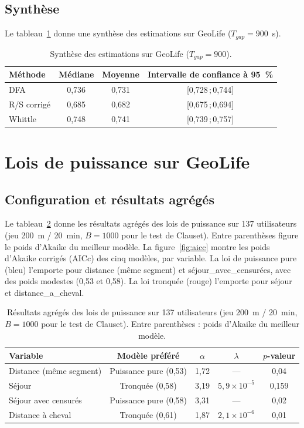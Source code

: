 \subsection{Synthèse}
Le tableau~\ref{tab:synthese_h} donne une synthèse des estimations sur GeoLife ($T_{gap} = 900$~s).

\begin{table}[H]
\centering
\caption{Synthèse des estimations sur GeoLife ($T_{gap}=900$).}
\label{tab:synthese_h}
\begin{tabular}{lccc}
\toprule
Méthode & Médiane & Moyenne & Intervalle de confiance à 95~\% \\
\midrule
DFA & 0,736 & 0,731 & [0,728\,;\,0,744] \\
R/S corrigé & 0,685 & 0,682 & [0,675\,;\,0,694] \\
Whittle & 0,748 & 0,741 & [0,739\,;\,0,757] \\
\bottomrule
\end{tabular}
\end{table}

\section{Lois de puissance sur GeoLife}
\label{sec:lois_puissance_geolife}

\subsection{Configuration et résultats agrégés}
Le tableau~\ref{tab:lois_puissance} donne les résultats agrégés des lois de puissance sur 137 utilisateurs (jeu 200~m / 20~min, $B = 1000$ pour le test de Clauset). Entre parenthèses figure le poids d'Akaike du meilleur modèle. La figure~\ref{fig:aicc} montre les poids d'Akaike corrigés (AICc) des cinq modèles, par variable. La loi de puissance pure (bleu) l'emporte pour distance (même segment) et séjour\_avec\_censurées, avec des poids modestes (0,53 et 0,58). La loi tronquée (rouge) l'emporte pour séjour et distance\_a\_cheval.

\begin{table}[H]
\centering
\caption{Résultats agrégés des lois de puissance sur 137 utilisateurs (jeu 200~m / 20~min, $B = 1000$ pour le test de Clauset). Entre parenthèses : poids d'Akaike du meilleur modèle.}
\label{tab:lois_puissance}
\begin{tabular}{lcccc}
\toprule
Variable & Modèle préféré & $\alpha$ & $\lambda$ & $p$-valeur \\
\midrule
Distance (même segment) & Puissance pure (0,53) & 1,72 & --- & 0,04 \\
Séjour & Tronquée (0,58) & 3,19 & $5{,}9 \times 10^{-5}$ & 0,159 \\
Séjour avec censurés & Puissance pure (0,58) & 3,31 & --- & 0,02 \\
Distance à cheval & Tronquée (0,61) & 1,87 & $2{,}1 \times 10^{-6}$ & 0,01 \\
\bottomrule
\end{tabular}
\end{table}


